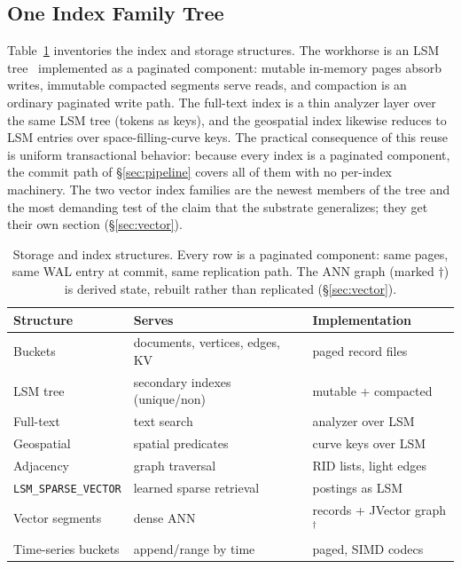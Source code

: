 \documentclass[conference]{IEEEtran}
\begin{document}
\subsection{One Index Family Tree}\label{sec:indexes}

Table~\ref{tab:inventory} inventories the index and storage structures. The
workhorse is an LSM tree~\cite{oneil1996lsm} implemented as a paginated
component: mutable in-memory pages absorb writes, immutable compacted segments
serve reads, and compaction is an ordinary paginated write path. The full-text
index is a thin analyzer layer over the same LSM tree (tokens as keys), and
the geospatial index likewise reduces to LSM entries over space-filling-curve
keys. The practical consequence of this reuse is uniform transactional
behavior: because every index is a paginated component, the commit path of
\S\ref{sec:pipeline} covers all of them with no per-index machinery. The two
vector index families are the newest members of the tree and the most
demanding test of the claim that the substrate generalizes; they get their own
section (\S\ref{sec:vector}).

\begin{table}[t]
\centering
\caption{Storage and index structures. Every row is a paginated component:
same pages, same WAL entry at commit, same replication path. The ANN graph
(marked $\dagger$) is derived state, rebuilt rather than replicated
(\S\ref{sec:vector}).}
\label{tab:inventory}
\small
\begin{tabular}{lll}
\toprule
Structure & Serves & Implementation \\
\midrule
Buckets & documents, vertices, edges, KV & paged record files \\
LSM tree & secondary indexes (unique/non) & mutable + compacted \\
Full-text & text search & analyzer over LSM \\
Geospatial & spatial predicates & curve keys over LSM \\
Adjacency & graph traversal & RID lists, light edges \\
\texttt{LSM\_SPARSE\_VECTOR} & learned sparse retrieval & postings as LSM \\
Vector segments & dense ANN & records + JVector graph$^\dagger$ \\
Time-series buckets & append/range by time & paged, SIMD codecs \\
\bottomrule
\end{tabular}
\end{table}
\end{document}
